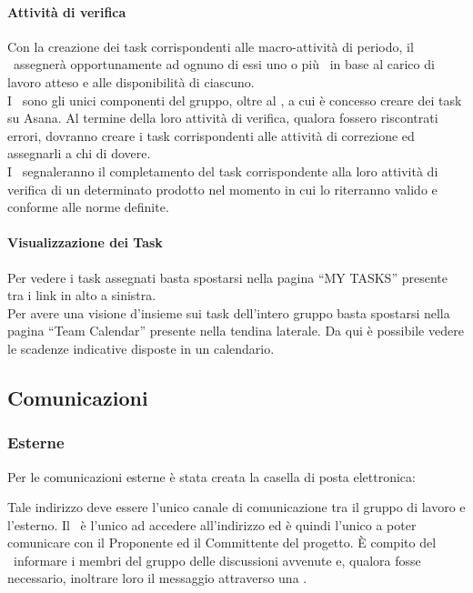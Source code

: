 \documentclass[../NormeDiProgetto.tex]{subfiles}
\begin{document}
				\paragraph{Attività di verifica\\}
					Con la creazione dei task corrispondenti alle macro-attività di periodo, il
					\responsabilediprogetto\ assegnerà opportunamente ad ognuno di essi uno o più \verificatori\
					in base al carico di lavoro atteso e alle disponibilità di ciascuno.\\
					I \verificatori\ sono gli unici componenti del gruppo, oltre al \responsabilediprogetto, a
					cui è concesso creare dei task su Asana. Al termine della loro attività di verifica, qualora
					fossero riscontrati errori, dovranno creare i task corrispondenti alle attività di correzione
					ed assegnarli a chi di dovere.\\
					I \verificatori\ segnaleranno il completamento del task corrispondente alla loro attività di
					verifica di un determinato prodotto nel momento in cui lo riterranno valido e conforme
					alle norme definite.
				\paragraph{Visualizzazione dei Task\\}
					Per vedere i task assegnati basta spostarsi nella pagina ``MY
					TASKS'' presente tra i link in alto a sinistra.\\
					Per avere una visione d'insieme sui task dell'intero gruppo basta
					spostarsi nella pagina ``Team Calendar'' presente nella tendina
					laterale. Da qui è possibile vedere le scadenze indicative disposte
					in un calendario.
		\subsection{Comunicazioni}
			\subsubsection{Esterne}
				Per le comunicazioni esterne è stata creata la casella di posta
				elettronica:
				\begin{center}
					\mailkaleidoscode
				\end{center}
				Tale indirizzo deve essere l'unico canale di comunicazione tra il
				gruppo di lavoro e l'esterno.
				Il \responsabilediprogetto\ è l'unico ad accedere
				all'indirizzo ed è quindi l'unico a poter comunicare con il Proponente ed il
				Committente del progetto. È compito del \responsabilediprogetto\ informare
				i membri del gruppo delle discussioni avvenute e,
				qualora fosse necessario, inoltrare loro il messaggio attraverso
				una .
\end{document}
